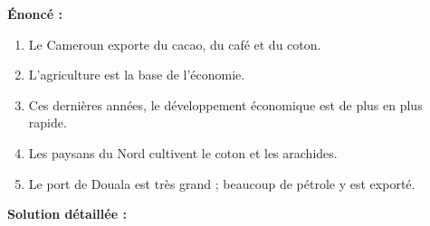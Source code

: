 \documentclass[11pt]{article}
\begin{document}
\begin{exoresolu}
\textbf{Énoncé :}
\begin{enumerate}
    \item Le Cameroun exporte du cacao, du café et du coton.
    \item L'agriculture est la base de l'économie.
    \item Ces dernières années, le développement économique est de plus en plus rapide.
    \item Les paysans du Nord cultivent le coton et les arachides.
    \item Le port de Douala est très grand ; beaucoup de pétrole y est exporté.
\end{enumerate}

\tcblower

\textbf{Solution détaillée :}


\end{exoresolu}
\end{document}

